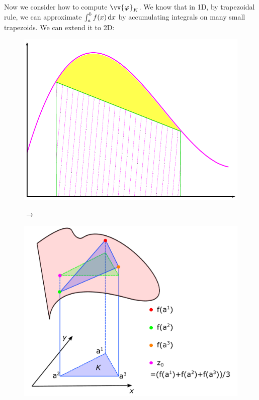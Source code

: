 	Now we consider how to compute $\vv{\bm{\varphi}}_K$. We know that in 1D,
	by trapezoidal rule, we can approximate $\int_a^b f(x)\,\mathrm{d} x$ by 
	accumulating integrals on many small trapezoids. We can extend it to 2D:
	\begin{figure}[!htbp]
		\centering
		\begin{minipage}{.4\textwidth}
			\centering
			\includegraphics[width=1\linewidth]{svg/trapezoidal_rule_1D}
		\end{minipage}\quad$\longrightarrow$\quad
		\begin{minipage}{.5\textwidth}
			\centering
			\includegraphics[width=1\linewidth]{svg/integrate_on_a_triangle}
		\end{minipage}
	\end{figure}\\
